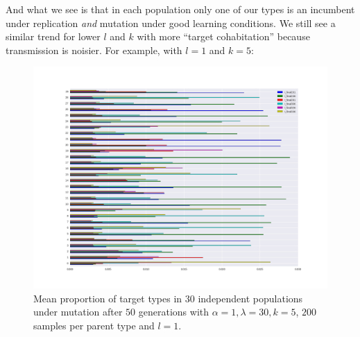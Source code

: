 \documentclass[a4paper]{article}
\begin{document}
And what we see is that in each population only one of our types is an incumbent under replication {\em and} mutation under good learning conditions. We still see a similar trend for lower $l$ and $k$ with more ``target cohabitation'' because transmission is noisier.  For example, with $l = 1$ and $k = 5$:


\begin{figure}[h!]
  \centering
    \includegraphics[scale=0.35]{../code-LOT-extension/plots/rm-lam30-a1-k5-s200-l1-meFalse432-nomean.png}
  \caption{Mean proportion of target types in $30$ independent populations under mutation after $50$ generations with $\alpha = 1, \lambda = 30, k = 5$, $200$ samples per parent type and $l = 1$.}
\end{figure}

\newpage


\end{document}
